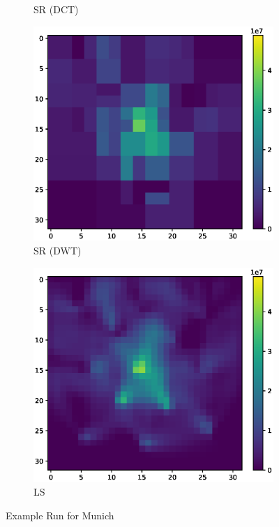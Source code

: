 \begin{figure}
\begin{subfigure}[b]{0.32\textwidth}
        \caption{SR (DCT)}
    \end{subfigure}    
    \begin{subfigure}[b]{0.32\textwidth}
        \includegraphics[width=\textwidth]{figures/06_results/gaussian_plume_example/munich/bp_dwt_snr_20_db.eps}
        \caption{SR (DWT)}
    \end{subfigure}
    \begin{subfigure}[b]{0.32\textwidth}
        \includegraphics[width=\textwidth]{figures/06_results/gaussian_plume_example/munich/least_squares_snr_20_db.eps}
        \caption{LS}
    \end{subfigure}
    \caption{Example Run for Munich}
\end{figure}
